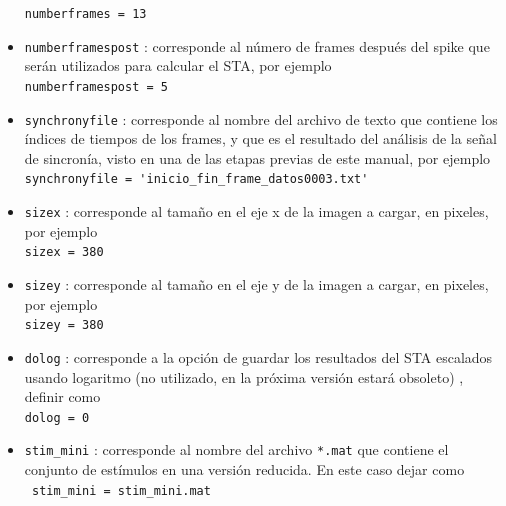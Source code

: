 \documentclass[10pt]{article}
\begin{document}
\begin{itemize}
\verb+numberframes = 13+ \\

\item \verb+numberframespost+ : corresponde al número de frames después del spike que serán utilizados para calcular el STA, por ejemplo \\

\verb+numberframespost = 5+\\

\item \verb+synchronyfile+ : corresponde al nombre del archivo de texto que contiene los índices de tiempos de los frames, y que es el resultado del análisis de la señal de sincronía, visto en una de las etapas previas de este manual, por ejemplo \\

\verb+synchronyfile = 'inicio_fin_frame_datos0003.txt'+ \\

\item \verb+sizex+  : corresponde al tamaño en el eje x de la imagen a cargar, en pixeles, por ejemplo \\

\verb+sizex = 380+ \\

\item \verb+sizey+  : corresponde al tamaño en el eje y de la imagen a cargar, en pixeles, por ejemplo \\

\verb+sizey = 380+ \\

\item \verb+dolog+ : corresponde a la opción de guardar los resultados del STA escalados usando logaritmo (no utilizado, en la próxima versión estará obsoleto) , definir como  \\

\verb+dolog = 0+ \\

\item \verb+stim_mini+ : corresponde al nombre del archivo \verb+*.mat+ que contiene el conjunto de estímulos en una versión reducida. En este caso dejar como \\

\verb+ stim_mini = stim_mini.mat+ \\

\end{itemize}
\end{document}
